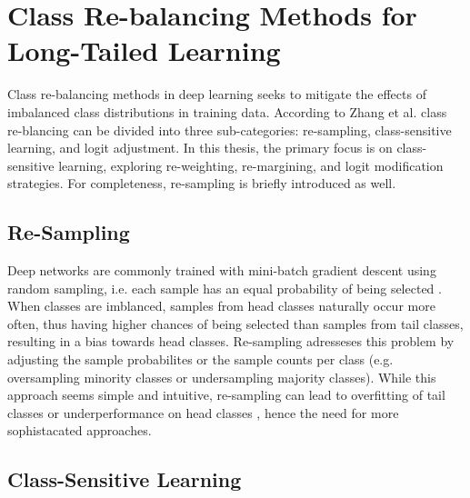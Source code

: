 


\section{Class Re-balancing Methods for Long-Tailed Learning}
\label{sec:lt_methods}

Class re-balancing methods in deep learning seeks to mitigate the effects of imbalanced class distributions in training data. According to Zhang et al. \cite{zhang2023deep} class re-blancing can be divided into three sub-categories: re-sampling, class-sensitive learning, and logit adjustment. In this thesis, the primary focus is on class-sensitive learning, exploring re-weighting, re-margining, and logit modification strategies. For completeness, re-sampling is briefly introduced as well.


\subsection{Re-Sampling}
\label{sec:re-sampling}
Deep networks are commonly trained with mini-batch gradient descent using random sampling, i.e. each sample has an equal probability of being selected \cite{zhang2023deep}. When classes are imblanced, samples from head classes naturally occur more often, thus having higher chances of being selected than samples from tail classes, resulting in a bias towards head classes. Re-sampling adresseses this problem by adjusting the sample probabilites or the sample counts per class (e.g. oversampling minority classes or undersampling majority classes). While this approach seems simple and intuitive, re-sampling can lead to overfitting of tail classes or underperformance on head classes \cite{zhang2023deep}, hence the need for more sophistacated approaches.

\subsection{Class-Sensitive Learning}
\label{sec:class-sensitive-learning}

